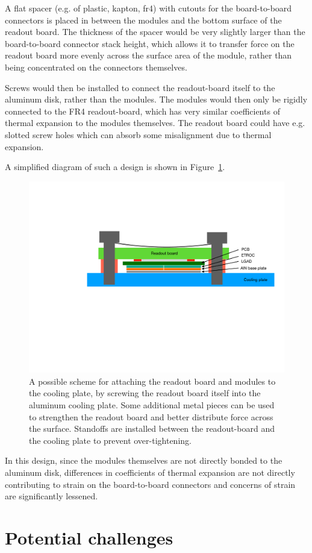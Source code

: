 \documentclass[11pt]{article}
\newcommand{\figref}[1]{Figure~\ref{fig:#1}}
\begin{document}
A flat spacer (e.g. of plastic, kapton, fr4) with cutouts for the board-to-board connectors is placed in between the modules and the bottom surface of the readout board. The thickness of the spacer would be very slightly larger than the board-to-board connector stack height, which allows it to transfer force on the readout board more evenly across the surface area of the module, rather than being concentrated on the connectors themselves.

Screws would then be installed to connect the readout-board itself to the aluminum disk, rather than the modules. The modules would then only be rigidly connected to the FR4 readout-board, which has very similar coefficients of thermal expansion to the modules themselves. The readout board could have e.g. slotted screw holes which can absorb some misalignment due to thermal expansion.

A simplified diagram of such a design is shown in \figref{rb-attachment}.

\begin{figure}[!hb]
  \centering
  \includegraphics[width=0.55 \textwidth]{figures/spring_loaded_sandwich.pdf}
  \caption{
    A possible scheme for attaching the readout board and modules to the cooling plate, by screwing the readout board itself into the aluminum cooling plate. Some additional metal pieces can be used to strengthen the readout board and better distribute force across the surface. Standoffs are installed between the readout-board and the cooling plate to prevent over-tightening.
  }\label{fig:rb-attachment}
\end{figure}

In this design, since the modules themselves are not directly bonded to the aluminum disk, differences in coefficients of thermal expansion are not directly contributing to strain on the board-to-board connectors and concerns of strain are significantly lessened.

\section{Potential challenges}
\end{document}
